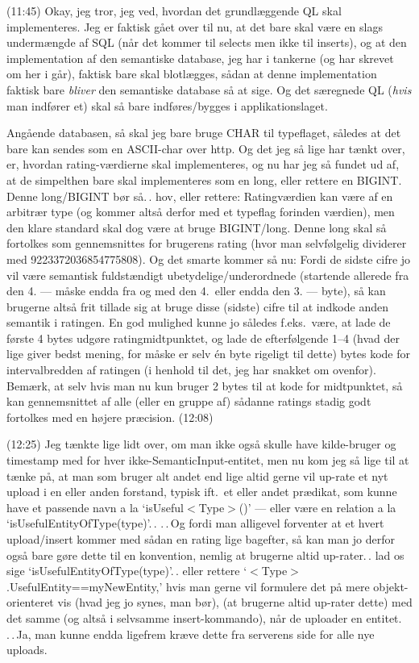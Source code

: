 \documentclass{report}
\begin{document}
(11:45) Okay, jeg tror, jeg ved, hvordan det grundlæggende QL skal implementeres. Jeg er faktisk gået over til nu, at det bare skal være en slags undermængde af SQL (når det kommer til selects men ikke til inserts), og at den implementation af den semantiske database, jeg har i tankerne (og har skrevet om her i går), faktisk bare skal blotlægges, sådan at denne implementation faktisk bare \emph{bliver} den semantiske database så at sige. Og det særegnede QL (\emph{hvis} man indfører et) skal så bare indføres/bygges i applikationslaget. 

Angående databasen, så skal jeg bare bruge CHAR til typeflaget, således at det bare kan sendes som en ASCII-char over http. Og det jeg så lige har tænkt over, er, hvordan rating-værdierne skal implementeres, og nu har jeg så fundet ud af, at de simpelthen bare skal implementeres som en long, eller rettere en BIGINT. Denne long/BIGINT bør så.\,. hov, eller rettere: Ratingværdien kan være af en arbitrær type (og kommer altså derfor med et typeflag forinden værdien), men den klare standard skal dog være at bruge BIGINT/long. Denne long skal så fortolkes som gennemsnittes for brugerens rating (hvor man selvfølgelig dividerer med  9223372036854775808). Og det smarte kommer så nu: Fordi de sidste cifre jo vil være semantisk fuldstændigt ubetydelige/underordnede (startende allerede fra den 4. --- måske endda fra og med den 4.\ eller endda den 3. --- byte), så kan brugerne altså frit tillade sig at bruge disse (sidste) cifre til at indkode anden semantik i ratingen. En god mulighed kunne jo således f.eks.\ være, at lade de første 4 bytes udgøre ratingmidtpunktet, og lade de efterfølgende 1--4 (hvad der lige giver bedst mening, for måske er selv én byte rigeligt til dette) bytes kode for intervalbredden af ratingen (i henhold til det, jeg har snakket om ovenfor). Bemærk, at selv hvis man nu kun bruger 2 bytes til at kode for midtpunktet, så kan gennemsnittet af alle (eller en gruppe af) sådanne ratings stadig godt fortolkes med en højere præcision. (12:08)

(12:25) Jeg tænkte lige lidt over, om man ikke også skulle have kilde-bruger og timestamp med for hver ikke-SemanticInput-entitet, men nu kom jeg så lige til at tænke på, at man som bruger alt andet end lige altid gerne vil up-rate et nyt upload i en eller anden forstand, typisk ift.\ et eller andet prædikat, som kunne have et passende navn a la `isUseful$<$Type$>$()' --- eller være en relation a la `isUsefulEntityOfType(type)'.\,. .\,.\,Og fordi man alligevel forventer at et hvert upload/insert kommer med sådan en rating lige bagefter, så kan man jo derfor også bare gøre dette til en konvention, nemlig at brugerne altid up-rater.\,. lad os sige `isUsefulEntityOfType(type)'.\,. eller rettere `$<$Type$>$.UsefulEntity==myNewEntity,' hvis man gerne vil formulere det på mere objekt-orienteret vis (hvad jeg jo synes, man bør), (at brugerne altid up-rater dette) med det samme (og altså i selvsamme insert-kommando), når de uploader en entitet. .\,.\,Ja, man kunne endda ligefrem kræve dette fra serverens side for alle nye uploads. 
\end{document}
